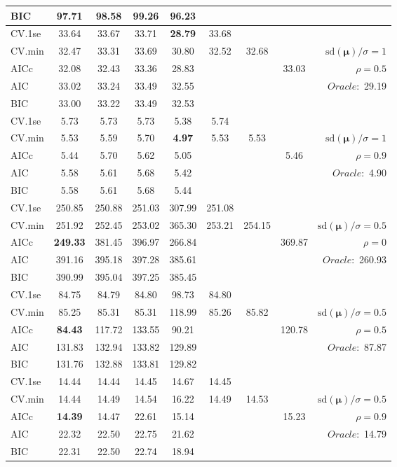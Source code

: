 \begin{table}
\begin{center}
\begin{tabular}{l*{7}{c}|r}
BIC & 97.71 & 98.58 & 99.26 & 96.23 & & & &  \\
 \hline 
CV.1se & 33.64 & 33.67 & 33.71 & {\bf 28.79} & 33.68 & & & \\
CV.min & 32.47 & 33.31 & 33.69 & 30.80 & 32.52 & 32.68 & & $\mathrm{sd}(\mathbf{\mu})/\sigma=1$ \\
AICc & 32.08 & 32.43 & 33.36 & 28.83 & & & 33.03 &  $\rho=0.5$ \\
AIC & 33.02 & 33.24 & 33.49 & 32.55 & & & &  \multirow{2}{*}{$Oracle: $ 29.19} \\
BIC & 33.00 & 33.22 & 33.49 & 32.53 & & & &  \\
 \hline 
CV.1se & 5.73 & 5.73 & 5.73 & 5.38 & 5.74 & & & \\
CV.min & 5.53 & 5.59 & 5.70 & {\bf 4.97} & 5.53 & 5.53 & & $\mathrm{sd}(\mathbf{\mu})/\sigma=1$ \\
AICc & 5.44 & 5.70 & 5.62 & 5.05 & & & 5.46 &  $\rho=0.9$ \\
AIC & 5.58 & 5.61 & 5.68 & 5.42 & & & &  \multirow{2}{*}{$Oracle: $ 4.90} \\
BIC & 5.58 & 5.61 & 5.68 & 5.44 & & & &  \\
 \hline 
CV.1se & 250.85 & 250.88 & 251.03 & 307.99 & 251.08 & & & \\
CV.min & 251.92 & 252.45 & 253.02 & 365.30 & 253.21 & 254.15 & & $\mathrm{sd}(\mathbf{\mu})/\sigma=0.5$ \\
AICc & {\bf 249.33} & 381.45 & 396.97 & 266.84 & & & 369.87 &  $\rho=0$ \\
AIC & 391.16 & 395.18 & 397.28 & 385.61 & & & &  \multirow{2}{*}{$Oracle: $ 260.93} \\
BIC & 390.99 & 395.04 & 397.25 & 385.45 & & & &  \\
 \hline 
CV.1se & 84.75 & 84.79 & 84.80 & 98.73 & 84.80 & & & \\
CV.min & 85.25 & 85.31 & 85.31 & 118.99 & 85.26 & 85.82 & & $\mathrm{sd}(\mathbf{\mu})/\sigma=0.5$ \\
AICc & {\bf 84.43} & 117.72 & 133.55 & 90.21 & & & 120.78 &  $\rho=0.5$ \\
AIC & 131.83 & 132.94 & 133.82 & 129.89 & & & &  \multirow{2}{*}{$Oracle: $ 87.87} \\
BIC & 131.76 & 132.88 & 133.81 & 129.82 & & & &  \\
 \hline 
CV.1se & 14.44 & 14.44 & 14.45 & 14.67 & 14.45 & & & \\
CV.min & 14.44 & 14.49 & 14.54 & 16.22 & 14.49 & 14.53 & & $\mathrm{sd}(\mathbf{\mu})/\sigma=0.5$ \\
AICc & {\bf 14.39} & 14.47 & 22.61 & 15.14 & & & 15.23 &  $\rho=0.9$ \\
AIC & 22.32 & 22.50 & 22.75 & 21.62 & & & &  \multirow{2}{*}{$Oracle: $ 14.79} \\
BIC & 22.31 & 22.50 & 22.74 & 18.94 & & & &  \\
 \hline 
\end{tabular}
\end{center}
\vspace{-1cm}
\end{table}




